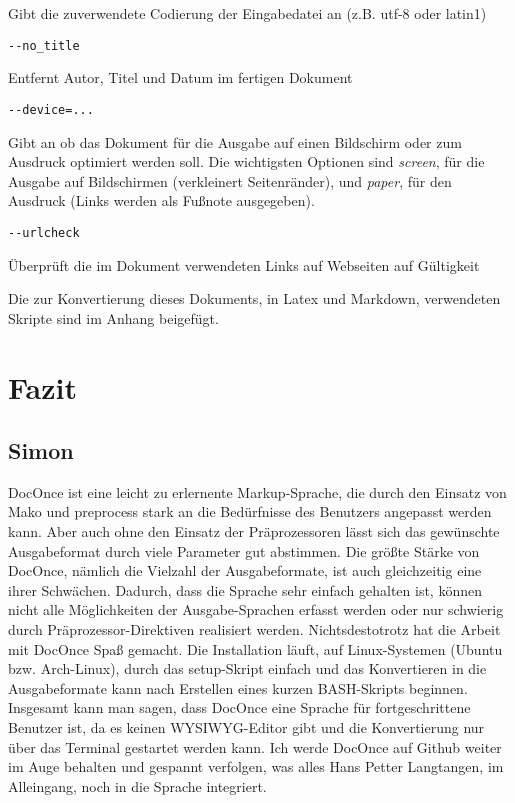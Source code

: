 \documentclass[%
oneside,                 %
final,                   %
chapterprefix=true,      %
open=right,              %
10pt]{book}
\begin{document}
Gibt die zuverwendete Codierung der Eingabedatei an (z.B. utf-8 oder latin1)

\begin{verbatim}
--no_title
\end{verbatim}

Entfernt Autor, Titel und Datum im fertigen Dokument

\begin{verbatim}
--device=...
\end{verbatim}

Gibt an ob das Dokument für die Ausgabe auf einen Bildschirm oder zum Ausdruck optimiert werden soll. Die wichtigsten Optionen sind \emph{screen}, für die Ausgabe auf Bildschirmen (verkleinert Seitenränder), und \emph{paper}, für den Ausdruck (Links werden als Fußnote ausgegeben).

\begin{verbatim}
--urlcheck
\end{verbatim}

Überprüft die im Dokument verwendeten Links auf Webseiten auf Gültigkeit

Die zur Konvertierung dieses Dokuments, in Latex und Markdown, verwendeten Skripte sind im Anhang beigefügt.
\chapter{Fazit}
\section{Simon}
DocOnce ist eine leicht zu erlernente Markup-Sprache, die durch den Einsatz von Mako und preprocess stark an die Bedürfnisse des Benutzers angepasst werden kann. Aber auch ohne den Einsatz der Präprozessoren lässt sich das gewünschte Ausgabeformat durch viele Parameter gut abstimmen. Die größte Stärke von DocOnce, nämlich die Vielzahl der Ausgabeformate, ist auch gleichzeitig eine ihrer Schwächen. Dadurch, dass die Sprache sehr einfach gehalten ist, können nicht alle Möglichkeiten der Ausgabe-Sprachen erfasst werden oder nur schwierig durch Präprozessor-Direktiven realisiert werden. Nichtsdestotrotz hat die Arbeit mit DocOnce Spaß gemacht. Die Installation läuft, auf Linux-Systemen (Ubuntu bzw. Arch-Linux), durch das setup-Skript einfach und das Konvertieren in die Ausgabeformate kann nach Erstellen eines kurzen BASH-Skripts beginnen. \\
Insgesamt kann man sagen, dass DocOnce eine Sprache für fortgeschrittene Benutzer ist, da es keinen WYSIWYG-Editor gibt und die Konvertierung nur über das Terminal gestartet werden kann. Ich werde DocOnce auf Github weiter im Auge behalten und gespannt verfolgen, was alles Hans Petter Langtangen, im Alleingang, noch in die Sprache integriert.
\end{document}
